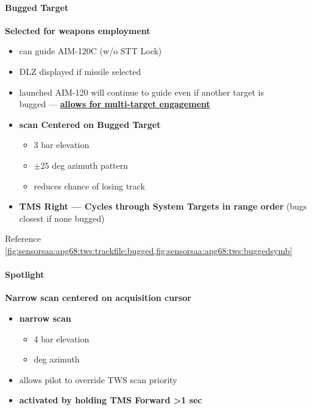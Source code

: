 \paragraph{Bugged Target}
\textbf{Selected for weapons employment}
\begin{itemize}
    \item can guide AIM-120C (w/o STT Lock)
    \item DLZ displayed if missile selected
    \item launched AIM-120 will continue to guide even if another target is \\
    bugged --- \textbf{\underline{allows for multi-target engagement}} 
    \item \textbf{scan Centered on Bugged Target}
    \begin{itemize}
        \item 3 bar elevation
        \item $\pm$25 deg azimuth pattern 
        \item reduces chance of losing track
    \end{itemize}
    \item \textbf{TMS Right --- Cycles through System Targets in range order} (bugs closest if none bugged)
\end{itemize}

Reference \cref{fig:sensorsaa:apg68:tws:trackfile:bugged,fig:sensorsaa:apg68:tws:buggedsymb}

\paragraph{Spotlight} 
\textbf{Narrow scan centered on acquisition cursor}
\begin{itemize}
    \item \textbf{narrow scan}
    \begin{itemize}
        \item 4 bar elevation 
        \item {} deg azimuth
    \end{itemize}
    \item allows pilot to override TWS scan priority
    \item \textbf{activated by holding TMS Forward >1 sec}
\end{itemize}

